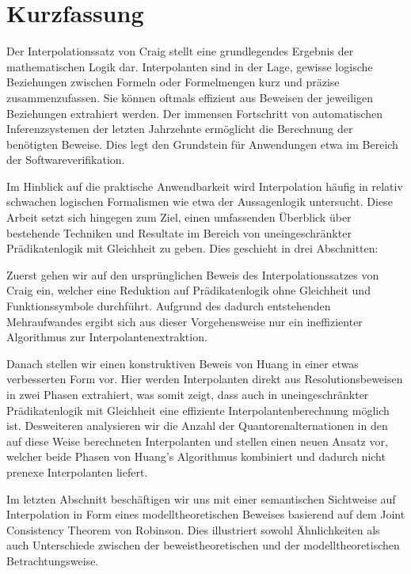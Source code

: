 \chapter*{Kurzfassung}

Der Interpolationssatz von Craig stellt eine grundlegendes Ergebnis der mathematischen Logik dar.
Interpolanten sind in der Lage, gewisse logische Beziehungen zwischen Formeln oder Formelmengen kurz und präzise zusammenzufassen. Sie können oftmals effizient aus Beweisen der jeweiligen Beziehungen extrahiert werden.
Der immensen Fortschritt von automatischen Inferenzsystemen der letzten Jahrzehnte ermöglicht die Berechnung der benötigten Beweise.
Dies legt den Grundstein für Anwendungen etwa im Bereich der Softwareverifikation.

Im Hinblick auf die praktische Anwendbarkeit wird Interpolation häufig in relativ schwachen logischen Formalismen wie etwa der Aussagenlogik untersucht.
Diese Arbeit setzt sich hingegen zum Ziel, einen umfassenden Überblick über bestehende Techniken und Resultate im Bereich von uneingeschränkter Prädikatenlogik mit Gleichheit zu geben.
Dies geschieht in drei Abschnitten:

Zuerst gehen wir auf den ursprünglichen Beweis des Interpolationssatzes von Craig ein, welcher eine Reduktion auf Prädikatenlogik ohne Gleichheit und Funktionssymbole durchführt.
Aufgrund des dadurch entstehenden Mehraufwandes ergibt sich aus dieser Vorgehensweise nur ein ineffizienter Algorithmus zur Interpolantenextraktion.

Danach stellen wir einen konstruktiven Beweis von Huang in einer etwas verbesserten Form vor.
Hier werden Interpolanten direkt aus Resolutionsbeweisen in zwei Phasen extrahiert, was somit zeigt, dass auch in uneingeschränkter Prädikatenlogik mit Gleichheit eine effiziente Interpolantenberechnung möglich ist.
Desweiteren analysieren wir die Anzahl der Quantorenalternationen in den auf diese Weise berechneten Interpolanten und stellen einen neuen Ansatz vor, welcher beide Phasen von Huang's Algorithmus kombiniert und dadurch nicht prenexe Interpolanten liefert.

Im letzten Abschnitt beschäftigen wir uns mit einer semantischen Sichtweise auf Interpolation in Form eines modelltheoretischen Beweises basierend auf dem Joint Consistency Theorem von Robinson.
Dies illustriert sowohl Ähnlichkeiten als auch Unterschiede zwischen der beweistheoretischen und der modelltheoretischen Betrachtungsweise.




